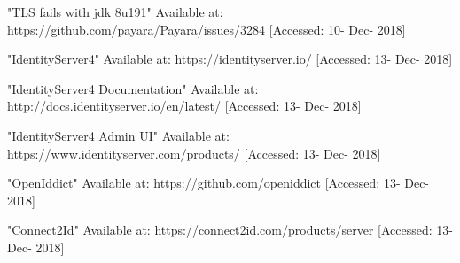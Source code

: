  "TLS fails with jdk 8u191" Available at: https://github.com/payara/Payara/issues/3284 [Accessed: 10- Dec- 2018]

 "IdentityServer4" Available at: https://identityserver.io/ [Accessed: 13- Dec- 2018]

 "IdentityServer4 Documentation" Available at: http://docs.identityserver.io/en/latest/ [Accessed: 13- Dec- 2018]

 "IdentityServer4 Admin UI" Available at: https://www.identityserver.com/products/ [Accessed: 13- Dec- 2018]

 "OpenIddict" Available at: https://github.com/openiddict [Accessed: 13- Dec- 2018]

 "Connect2Id" Available at: https://connect2id.com/products/server [Accessed: 13- Dec- 2018]
